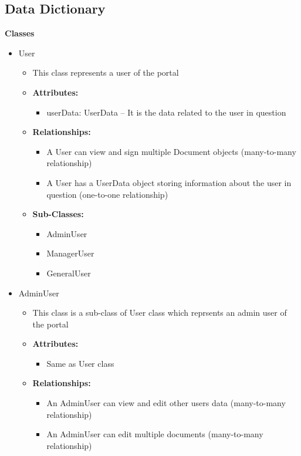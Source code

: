 \documentclass[12pt]{article}
\begin{document}
\subsection{Data Dictionary}
\textbf{Classes}
\begin{itemize}
  \item  User
    \begin{itemize}
      \item This class represents a user of the portal
      \item \textbf{Attributes:}
        \begin{itemize}
          \item userData: UserData -- It is the data related to the
            user in question
        \end{itemize}

      \item \textbf{Relationships:}
        \begin{itemize}
          \item A User can view and sign multiple Document objects
            (many-to-many relationship)
          \item A User has a UserData object storing information
            about the user in question (one-to-one relationship)
        \end{itemize}

      \item \textbf{Sub-Classes:}
        \begin{itemize}
          \item AdminUser
          \item ManagerUser
          \item GeneralUser
        \end{itemize}
    \end{itemize}
  \item AdminUser
    \begin{itemize}
      \item This class is a sub-class of User class which reprsents
        an admin user of the portal
      \item \textbf{Attributes:}
        \begin{itemize}
          \item Same as User class
        \end{itemize}
      \item \textbf{Relationships:}
        \begin{itemize}
          \item An AdminUser can view and edit other users data
            (many-to-many relationship)
          \item An AdminUser can edit multiple documents
            (many-to-many relationship)
        \end{itemize}
    \end{itemize}


\end{itemize}
\end{document}
